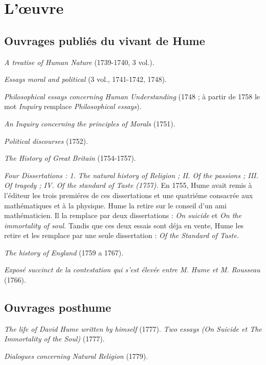 
\chapter{L'{\oe}uvre}

\section{Ouvrages publiés du vivant de Hume}
% 
{\it A treatise of Human Nature} (1739-1740, 3 vol.).

{\it Essays moral and political} (3 vol., 1741-1742, 1748).

{\it Philosophical essays concerning Human Understanding}
(1748 ; à partir de 1758 le mot {\it Inquiry} remplace {\it Philosophical essays}).

{\it An Inquiry concerning the principles of Morals} (1751).

{\it Political discourses} (1752).

{\it The History of Great Britain} (1754-1757).

{\it Four Dissertations : 1. The natural history of Religion ;
II. Of the passions ; III. Of tragedy ; IV. Of the standard
of Taste (1757).} En 1755, Hume avait remis à l’éditeur
les trois premiéres de ces dissertations et une quatriéme
consacrée aux mathématiques et à la physique. Hume
la retire sur le conseil d’un ami mathématicien. Il la
remplace par deux dissertations : {\it On suicide} et {\it On the
immortality of soul.} Tandis que ces deux essais sont
déja en vente, Hume les retire et les remplace par une
seule dissertation : {\it Of the Standard of Taste. }

{\it The history of England} (1759 a 1767).

{\it Exposé succinct de la contestation qui s’est élevée entre
M. Hume et M. Rousseau} (1766).

\section{Ouvrages posthume}

{\it The life of David Hume written by himself} (1777).
{\it Two essays (On Suicide et The Immortality of the Soul)}
(1777).

 

{\it Dialogues concerning Natural Religion} (1779).

